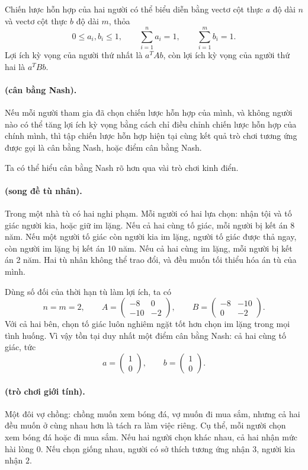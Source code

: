 \documentclass[11pt]{article}
\begin{document}
Chiến lược hỗn hợp của hai người có thể biểu diễn bằng vectơ cột thực \(a\) độ
dài \(n\) và vectơ cột thực \(b\) độ dài \(m\), thỏa
\[
  0\le a_i,b_i\le 1,\qquad \sum_{i=1}^{n}a_i=1,\qquad
  \sum_{i=1}^{m}b_i=1.
\]
Lợi ích kỳ vọng của người thứ nhất là \(a^TAb\), còn lợi ích kỳ vọng của người
thứ hai là \(a^TBb\).

\paragraph{ (cân bằng Nash).}
Nếu mỗi người tham gia đã chọn chiến lược hỗn hợp của mình, và không người nào
có thể tăng lợi ích kỳ vọng bằng cách chỉ điều chỉnh chiến lược hỗn hợp của
chính mình, thì tập chiến lược hỗn hợp hiện tại cùng kết quả trò chơi tương ứng
được gọi là cân bằng Nash, hoặc điểm cân bằng Nash.

Ta có thể hiểu cân bằng Nash rõ hơn qua vài trò chơi kinh điển.

\paragraph{ (song đề tù nhân).}
Trong một nhà tù có hai nghi phạm. Mỗi người có hai lựa chọn: nhận tội và tố
giác người kia, hoặc giữ im lặng. Nếu cả hai cùng tố giác, mỗi người bị kết án
8 năm. Nếu một người tố giác còn người kia im lặng, người tố giác được thả ngay,
còn người im lặng bị kết án 10 năm. Nếu cả hai cùng im lặng, mỗi người bị kết
án 2 năm. Hai tù nhân không thể trao đổi, và đều muốn tối thiểu hóa án tù của
mình.

Dùng số đối của thời hạn tù làm lợi ích, ta có
\[
  n=m=2,\qquad
  A=\begin{pmatrix}-8&0\\ -10&-2\end{pmatrix},\qquad
  B=\begin{pmatrix}-8&-10\\ 0&-2\end{pmatrix}.
\]
Với cả hai bên, chọn tố giác luôn nghiêm ngặt tốt hơn chọn im lặng trong mọi
tình huống. Vì vậy tồn tại duy nhất một điểm cân bằng Nash: cả hai cùng tố
giác, tức
\[
  a=\begin{pmatrix}1\\0\end{pmatrix},\qquad
  b=\begin{pmatrix}1\\0\end{pmatrix}.
\]

\paragraph{ (trò chơi giới tính).}
Một đôi vợ chồng: chồng muốn xem bóng đá, vợ muốn đi mua sắm, nhưng cả hai đều
muốn ở cùng nhau hơn là tách ra làm việc riêng. Cụ thể, mỗi người chọn xem bóng
đá hoặc đi mua sắm. Nếu hai người chọn khác nhau, cả hai nhận mức hài lòng
\(0\). Nếu chọn giống nhau, người có sở thích tương ứng nhận \(3\), người kia
nhận \(2\).
\end{document}
